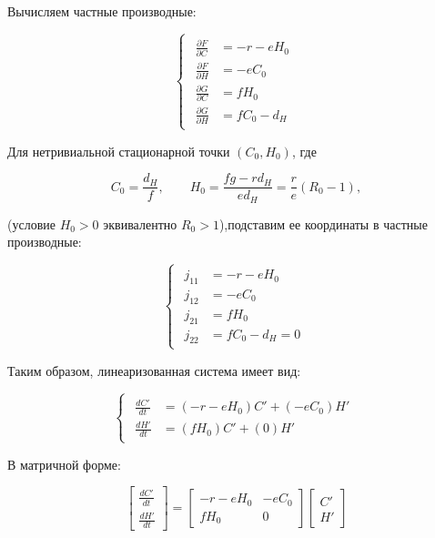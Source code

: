 \documentclass[a4paper, 14pt]{extarticle}
\begin{document}
Вычисляем частные производные:

\begin{equation}
    \begin{cases}
        \begin{aligned}
    \frac{\partial F}{\partial C} &= -r - e H_0 \\
    \frac{\partial F}{\partial H} &= -e C_0 \\
    \frac{\partial G}{\partial C} &= f H_0 \\
    \frac{\partial G}{\partial H} &= f C_0 - d_H
        \end{aligned}
    \end{cases}
\end{equation}

Для нетривиальной стационарной точки $(C_0, H_0)$, где 

\[
C_0 = \frac{d_H}{f}, \qquad 
H_0 = \frac{f g - r d_H}{e d_H} = \frac{r}{e}(R_0 - 1),
\]

(условие $H_0 > 0$ эквивалентно $R_0 > 1$),подставим ее координаты в частные производные:

\begin{equation}
    \begin{cases}
        \begin{aligned}
    j_{11} &= -r - e H_0 \\
    j_{12} &= -e C_0 \\
    j_{21} &= f H_0 \\
    j_{22} &= f C_0 - d_H = 0 
        \end{aligned}
    \end{cases}
\end{equation}

Таким образом, линеаризованная система имеет вид:

\begin{equation}
    \begin{cases}
        \begin{aligned}
    \frac{dC'}{dt} &= (-r - e H_0) C' + (-e C_0) H' \\
    \frac{dH'}{dt} &= (f H_0) C' + (0) H'
        \end{aligned}
    \end{cases}
\end{equation}

В матричной форме:

\[
\begin{bmatrix} \frac{dC'}{dt} \\ \frac{dH'}{dt} \end{bmatrix} = 
\begin{bmatrix} 
    -r - e H_0 & -e C_0 \\ 
    f H_0 & 0 
\end{bmatrix}
\begin{bmatrix} C' \\ H' \end{bmatrix}
\]
\end{document}
